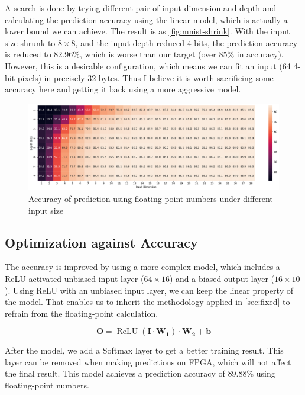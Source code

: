 A search is done by trying different pair of input dimension and depth and calculating the prediction accuracy using the linear model, which is actually a lower bound we can achieve.
The result is as \autoref{fig:mnist-shrink}.
With the input size shrunk to \(8 \times 8\), and the input depth reduced 4 bits,
the prediction accuracy is reduced to 82.96\%, which is worse than our target (over 85\% in accuracy).
However, this is a desirable configuration, which means we can fit an input (64 4-bit pixels) in precisely 32 bytes.
Thus I believe it is worth sacrificing some accuracy here and getting it back using a more aggressive model.

\begin{figure}[ht!]
    \centering
    \includegraphics[width=\textwidth]{images/mnist-shrink.pdf}
    \caption{Accuracy of prediction using floating point numbers under different input size}
    \label{fig:mnist-shrink}
\end{figure}

\subsection{Optimization against Accuracy}

The accuracy is improved by using a more complex model, which includes a ReLU activated unbiased input layer (\(64 \times 16\)) and a biased output layer (\(16\times 10\)).
Using ReLU with an unbiased input layer, we can keep the linear property of the model.
That enables us to inherit the methodology applied in \autoref{sec:fixed} to refrain from the floating-point calculation.

\[
    \mathbf{O} = \operatorname{ReLU}(\mathbf{I} \cdot \mathbf{W_1}) \cdot \mathbf{W_2} + \mathbf{b}
\]

After the model, we add a Softmax layer to get a better training result.
This layer can be removed when making predictions on FPGA, which will not affect the final result.
This model achieves a prediction accuracy of 89.88\% using floating-point numbers.

